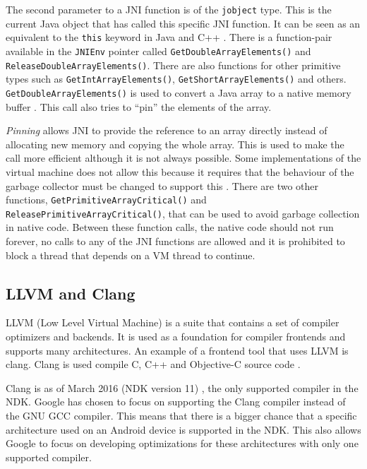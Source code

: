 The second parameter to a JNI function is of the \texttt{jobject} type. This is the current Java object that has called this specific JNI function. It can be seen as an equivalent to the \texttt{this} keyword in Java and C++ \cite[p.~23]{liang1999java}. There is a function-pair available in the \texttt{JNIEnv} pointer called \texttt{GetDoubleArrayElements()} and \texttt{ReleaseDoubleArrayElements()}. There are also functions for other primitive types such as \texttt{GetIntArrayElements()}, \texttt{GetShortArrayElements()} and others. \texttt{GetDoubleArrayElements()} is used to convert a Java array to a native memory buffer \cite[p.~159]{liang1999java}. This call also tries to \enquote{pin} the elements of the array.

\emph{Pinning} allows JNI to provide the reference to an array directly instead of allocating new memory and copying the whole array. This is used to make the call more efficient although it is not always possible. Some implementations of the virtual machine does not allow this because it requires that the behaviour of the garbage collector must be changed to support this \cite[p.~158]{liang1999java}. There are two other functions, \texttt{GetPrimitiveArrayCritical()} and \texttt{ReleasePrimitiveArrayCritical()}, that can be used to avoid garbage collection in native code. Between these function calls, the native code should not run forever, no calls to any of the JNI functions are allowed and it is prohibited to block a thread that depends on a VM thread to continue.


\subsection{LLVM and Clang}
LLVM (Low Level Virtual Machine) is a suite that contains a set of compiler optimizers and backends. It is used as a foundation for compiler frontends and supports many architectures. An example of a frontend tool that uses LLVM is \gls{clang}. Clang is used compile C, C++ and Objective-C source code \cite{clang:comp}.

Clang is as of March 2016 (NDK version 11) \cite{android:ndk:revision}, the only supported compiler in the NDK. Google has chosen to focus on supporting the Clang compiler instead of the GNU GCC compiler. This means that there is a bigger chance that a specific architecture used on an Android device is supported in the NDK. This also allows Google to focus on developing optimizations for these architectures with only one supported compiler.




